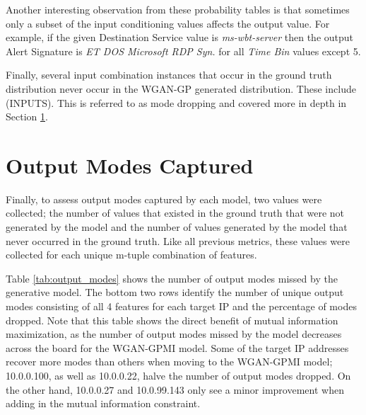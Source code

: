 Another interesting observation from these probability tables is that sometimes only a subset of the input conditioning values affects the output value. For example, if the given Destination Service value is \emph{ms-wbt-server} then the output Alert Signature is \emph{ET DOS Microsoft RDP Syn.} for all \emph{Time Bin} values except 5.

Finally, several input combination instances that occur in the ground truth distribution never occur in the WGAN-GP generated distribution. These include (INPUTS). This is referred to as mode dropping and covered more in depth in Section \ref{sec:output}.

\section{Output Modes Captured}
\label{sec:output}
Finally, to assess output modes captured by each model, two values were collected; the number of values that existed in the ground truth that were not generated by the model and the number of values generated by the model that never occurred in the ground truth. Like all previous metrics, these values were collected for each unique m-tuple combination of features.

Table \ref{tab:output_modes} shows the number of output modes missed by the generative model. The bottom two rows identify the number of unique output modes consisting of all 4 features for each target IP and the percentage of modes dropped.  Note that this table shows the direct benefit of mutual information maximization, as the number of output modes missed by the model decreases across the board for the WGAN-GPMI model. Some of the target IP addresses recover more modes than others when moving to the WGAN-GPMI model; 10.0.0.100, as well as 10.0.0.22,  halve the number of output modes dropped. On the other hand, 10.0.0.27 and 10.0.99.143 only see a minor improvement when adding in the mutual information constraint.


